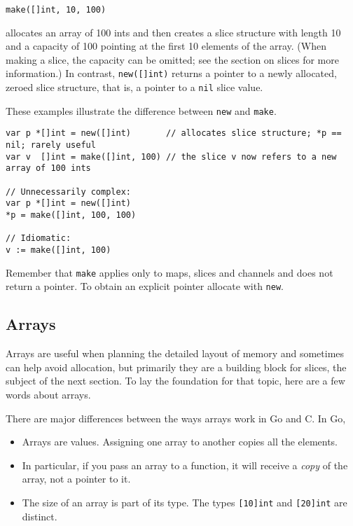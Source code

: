 \begin{Verbatim}[frame=single]
make([]int, 10, 100)
\end{Verbatim}

allocates an array of 100 ints and then creates a slice structure with
length 10 and a capacity of 100 pointing at the first 10 elements of the
array. (When making a slice, the capacity can be omitted; see the
section on slices for more information.) In contrast,
\texttt{new({[}{]}int)} returns a pointer to a newly allocated, zeroed
slice structure, that is, a pointer to a \texttt{nil} slice value.

These examples illustrate the difference between \texttt{new} and
\texttt{make}.

\begin{Verbatim}[frame=single]
var p *[]int = new([]int)       // allocates slice structure; *p == nil; rarely useful
var v  []int = make([]int, 100) // the slice v now refers to a new array of 100 ints

// Unnecessarily complex:
var p *[]int = new([]int)
*p = make([]int, 100, 100)

// Idiomatic:
v := make([]int, 100)
\end{Verbatim}

Remember that \texttt{make} applies only to maps, slices and channels
and does not return a pointer. To obtain an explicit pointer allocate
with \texttt{new}.

\subsection*{Arrays}

Arrays are useful when planning the detailed layout of memory and
sometimes can help avoid allocation, but primarily they are a building
block for slices, the subject of the next section. To lay the foundation
for that topic, here are a few words about arrays.

There are major differences between the ways arrays work in Go and C. In
Go,

\begin{itemize}
\item
  Arrays are values. Assigning one array to another copies all the
  elements.
\item
  In particular, if you pass an array to a function, it will receive a
  \emph{copy} of the array, not a pointer to it.
\item
  The size of an array is part of its type. The types
  \texttt{{[}10{]}int} and \texttt{{[}20{]}int} are distinct.
\end{itemize}

